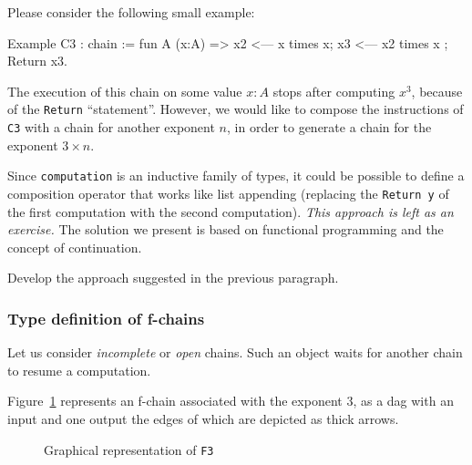 Please consider the following small example:

\begin{Coqsrc}
Example C3 : chain :=
 fun A (x:A) =>
  x2 <--- x times x;
  x3 <--- x2 times x ;
  Return x3.
\end{Coqsrc}

The execution of this chain on  some value $x:A$ stops after 
computing \texttt{$x^3$}, because of the \texttt{Return} ``statement''.
However, we would like to compose the instructions of \texttt{C3} 
with a chain for another exponent $n$, in order to generate a chain for 
the exponent $3\times n$.

Since \texttt{computation} is an inductive family of types, 
it could be possible to define a composition operator that 
works like list appending (replacing the \texttt{Return y} of the first
computation with the second computation).
\emph{This approach is left as an exercise.}  The solution we present is based on functional programming and the concept of continuation.

\begin{exercise}
Develop the approach suggested in the previous paragraph.  
\end{exercise}


\subsubsection{Type definition of  f-chains}

Let us   consider \emph{incomplete} or \emph{open} chains.
Such an object waits for another chain to resume  a computation.

Figure~\ref{fig:F3-as-dag} represents an  f-chain associated with the exponent $3$, as a dag with an input and one output the edges of which are depicted as thick arrows.

\begin{figure}[h]
  \centering
  \caption{Graphical representation of \texttt{F3}}
  \label{fig:F3-as-dag}
\end{figure}

